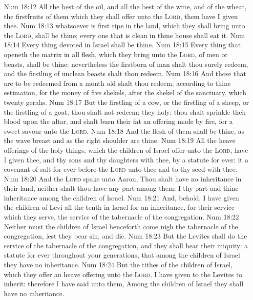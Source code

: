 \vs Num 18:12 All the best of the oil, and all the best of the wine, and of the wheat, the firstfruits of them which they shall offer unto the \textsc{Lord}, them have I given thee.
\vs Num 18:13  whatsoever is first ripe in the land, which they shall bring unto the \textsc{Lord}, shall be thine; every one that is clean in thine house shall eat  it.
\vs Num 18:14 Every thing devoted in Israel shall be thine.
\vs Num 18:15 Every thing that openeth the matrix in all flesh, which they bring unto the \textsc{Lord},  of men or beasts, shall be thine: nevertheless the firstborn of man shalt thou surely redeem, and the firstling of unclean beasts shalt thou redeem.
\vs Num 18:16 And those that are to be redeemed from a month old shalt thou redeem, according to thine estimation, for the money of five shekels, after the shekel of the sanctuary, which  twenty gerahs.
\vs Num 18:17 But the firstling of a cow, or the firstling of a sheep, or the firstling of a goat, thou shalt not redeem; they  holy: thou shalt sprinkle their blood upon the altar, and shalt burn their fat  an offering made by fire, for a sweet savour unto the \textsc{Lord}.
\vs Num 18:18 And the flesh of them shall be thine, as the wave breast and as the right shoulder are thine.
\vs Num 18:19 All the heave offerings of the holy things, which the children of Israel offer unto the \textsc{Lord}, have I given thee, and thy sons and thy daughters with thee, by a statute for ever: it  a covenant of salt for ever before the \textsc{Lord} unto thee and to thy seed with thee.
\vs Num 18:20 And the \textsc{Lord} spake unto Aaron, Thou shalt have no inheritance in their land, neither shalt thou have any part among them: I  thy part and thine inheritance among the children of Israel.
\vs Num 18:21 And, behold, I have given the children of Levi all the tenth in Israel for an inheritance, for their service which they serve,  the service of the tabernacle of the congregation.
\vs Num 18:22 Neither must the children of Israel henceforth come nigh the tabernacle of the congregation, lest they bear sin, and die.
\vs Num 18:23 But the Levites shall do the service of the tabernacle of the congregation, and they shall bear their iniquity:  a statute for ever throughout your generations, that among the children of Israel they have no inheritance.
\vs Num 18:24 But the tithes of the children of Israel, which they offer  an heave offering unto the \textsc{Lord}, I have given to the Levites to inherit: therefore I have said unto them, Among the children of Israel they shall have no inheritance.
